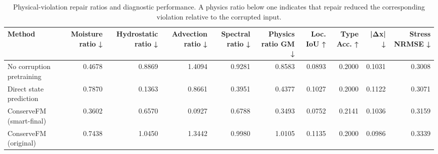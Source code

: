 \begin{table}
\caption{Physical-violation repair ratios and diagnostic performance. A physics ratio below one indicates that repair reduced the corresponding violation relative to the corrupted input.}
\label{tab:physics_diagnostics}
\begin{tabular}{lrrrrrrrrr}
\toprule
Method & Moisture ratio ↓ & Hydrostatic ratio ↓ & Advection ratio ↓ & Spectral ratio ↓ & Physics ratio GM ↓ & Loc. IoU ↑ & Type Acc. ↑ & |Δx| ↓ & Stress NRMSE ↓ \\
\midrule
No corruption pretraining & 0.4678 & 0.8869 & 1.4094 & 0.9281 & 0.8583 & 0.0893 & 0.2000 & 0.1031 & 0.3008 \\
Direct state prediction & 0.7870 & 0.1363 & 0.8661 & 0.3951 & 0.4377 & 0.1027 & 0.2000 & 0.1122 & 0.3071 \\
ConserveFM (smart-final) & 0.3602 & 0.6570 & 0.0927 & 0.6788 & 0.3493 & 0.0752 & 0.2141 & 0.1036 & 0.3159 \\
ConserveFM (original) & 0.7438 & 1.0450 & 1.3442 & 0.9980 & 1.0105 & 0.1135 & 0.2000 & 0.0986 & 0.3339 \\
\bottomrule
\end{tabular}
\end{table}
